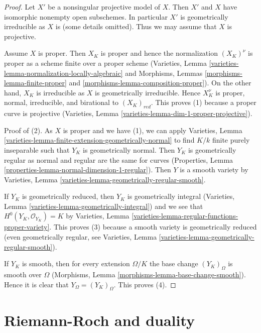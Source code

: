 \begin{proof}
Let $X'$ be a nonsingular projective model of $X$. Then $X'$ and
$X$ have isomorphic nonempty open subschemes. In particular
$X'$ is geometrically irreducible as $X$ is (some details omitted).
Thus we may assume that $X$ is projective.

\medskip\noindent
Assume $X$ is proper. Then $X_K$ is proper and hence the normalization
$(X_K)^\nu$ is proper as a scheme finite over a proper scheme
(Varieties, Lemma \ref{varieties-lemma-normalization-locally-algebraic}
and Morphisms, Lemmas \ref{morphisms-lemma-finite-proper} and
\ref{morphisms-lemma-composition-proper}).
On the other hand, $X_K$ is irreducible as $X$ is geometrically
irreducible. Hence $X_K^\nu$ is proper, normal, irreducible, and birational
to $(X_K)_{red}$. This proves (1) because a proper curve is projective
(Varieties, Lemma \ref{varieties-lemma-dim-1-proper-projective}).

\medskip\noindent
Proof of (2). As $X$ is proper and we have (1), we can apply
Varieties, Lemma \ref{varieties-lemma-finite-extension-geometrically-normal}
to find $K/k$ finite purely inseparable such that
$Y_K$ is geometrically normal. Then $Y_K$ is geometrically regular
as normal and regular are the same for curves
(Properties, Lemma \ref{properties-lemma-normal-dimension-1-regular}).
Then $Y$ is a smooth variety by
Varieties, Lemma \ref{varieties-lemma-geometrically-regular-smooth}.

\medskip\noindent
If $Y_K$ is geometrically reduced, then $Y_K$ is geometrically
integral (Varieties, Lemma \ref{varieties-lemma-geometrically-integral})
and we see that $H^0(Y_K, \mathcal{O}_{Y_K}) = K$ by
Varieties, Lemma \ref{varieties-lemma-regular-functions-proper-variety}.
This proves (3) because a smooth variety is geometrically reduced
(even geometrically regular, see
Varieties, Lemma \ref{varieties-lemma-geometrically-regular-smooth}).

\medskip\noindent
If $Y_K$ is smooth, then for every extension $\Omega/K$
the base change $(Y_K)_\Omega$ is smooth over $\Omega$
(Morphisms, Lemma \ref{morphisms-lemma-base-change-smooth}).
Hence it is clear that $Y_\Omega = (Y_K)_\Omega$. This proves (4).
\end{proof}






\section{Riemann-Roch and duality}
\label{section-Riemann-Roch}

